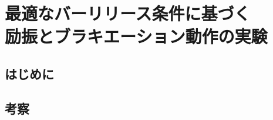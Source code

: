 \chapter[最適なバーリリース条件に基づく励振とブラキエーション動作の実験]%
{最適なバーリリース条件に基づく\\励振とブラキエーション動作の実験}
        \section{はじめに}

          

        \section{考察}
